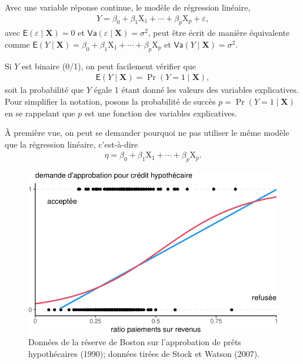 \documentclass[
  11pt,
  letterpaper,
]{book}
\theoremstyle{definition}
\theoremstyle{remark}
\begin{document}
Avec une variable réponse continue, le modèle de régression linéaire,
\begin{align*}
 Y = \beta_0 + \beta_1\mathrm{X}_1 + \cdots + \beta_p \mathrm{X}_p + \varepsilon,
\end{align*} avec \(\mathsf{E}(\varepsilon \mid \mathbf{X})=0\) et
\(\mathsf{Va}(\varepsilon \mid \mathbf{X})=\sigma^2\), peut être écrit
de manière équivalente comme
\(\mathsf{E}(Y \mid \mathbf{X}) = \beta_0 + \beta_1\mathrm{X}_1 + \cdots + \beta_p\mathrm{X}_p\)
et \(\mathsf{Va}(Y \mid \mathbf{X})=\sigma^2.\)

Si \(Y\) est binaire (0/1), on peut facilement vérifier que
\begin{align*}
\mathsf{E}(Y \mid \mathbf{X}) = \Pr(Y=1 \mid  \mathbf{X}),
\end{align*} soit la probabilité que \(Y\) égale 1 étant donné les
valeurs des variables explicatives. Pour simplifier la notation, posons
la probabilité de succès \(p = \Pr(Y=1 \mid \mathbf{X})\) en se
rappelant que \(p\) est une fonction des variables explicatives.

À première vue, on peut se demander pourquoi ne pas utiliser le même
modèle que la régression linéaire, c'est-à-dire \begin{align*}
\eta=\beta_0 + \beta_1\mathrm{X}_1 + \cdots + \beta_p \mathrm{X}_p.
\end{align*}

\begin{figure}[ht!]

{\centering \includegraphics{./05-reglogistique_files/figure-pdf/fig-demandecredit-1.pdf}

}

\caption{\label{fig-demandecredit}Données de la réserve de Boston sur
l'approbation de prêts hypothécaires (1990); données tirées de Stock et
Watson (2007).}

\end{figure}
\end{document}
